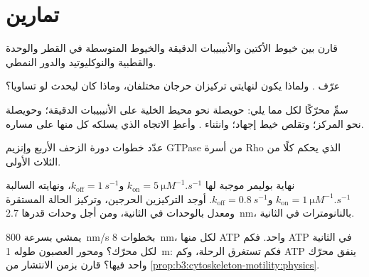 \section{تمارين}

\begin{exercise}[$\star$]\label{exo:b3:cytoskeleton-motility:1}
قارن بين خيوط الأكتين والأنيبيبات الدقيقة والخيوط المتوسطة في
القطر والوحدة والقطبية والنوكليوتيد والدور النمطي.
\end{exercise}

\begin{exercise}[$\star$]\label{exo:b3:cytoskeleton-motility:2}
عرّف . ولماذا يكون لنهايتي 
تركيزان حرجان مختلفان، وماذا كان ليحدث لو
تساويا؟
\end{exercise}

\begin{exercise}[$\star$]\label{exo:b3:cytoskeleton-motility:3}
سمِّ محرّكًا لكل مما يلي: حويصلة نحو محيط الخلية على
الأنيبيبات الدقيقة؛ وحويصلة نحو المركز؛ وتقلص خيط
إجهاد؛ وانثناء . وأعطِ الاتجاه الذي يسلكه كل منها على مساره.
\end{exercise}

\begin{exercise}[$\star$]\label{exo:b3:cytoskeleton-motility:4}
عدّد خطوات دورة الزحف الأربع وإنزيم GTPase من أسرة Rho
الذي يحكم كلًا من الثلاث الأولى.
\end{exercise}

\begin{exercise}[$\star\star$]\label{exo:b3:cytoskeleton-motility:5}
نهاية بوليمر موجبة لها $k_{\text{on}} = \qty{5}{\micro M^{-1}.s^{-1}}$
و$k_{\text{off}} = \qty{1}{s^{-1}}$، ونهايته السالبة $k_{\text{on}} =
\qty{1}{\micro M^{-1}.s^{-1}}$ و$k_{\text{off}} = \qty{0.8}{s^{-1}}$.
أوجد التركيزين الحرجين، وتركيز الحالة المستقرة
ومعدل  بالوحدات في الثانية، ومن أجل
وحدات قدرها \qty{2.7}{nm}، بالنانومترات في الثانية.
\end{exercise}

\begin{exercise}[$\star\star$]\label{exo:b3:cytoskeleton-motility:6}
يمشي  بسرعة \qty{800}{nm/s} بخطوات \qty{8}{nm}، لكل منها ATP واحد.
فكم ATP في الثانية لكل محرّك؟ ومحور العصبون طوله \qty{1}{m}: فكم
تستغرق الرحلة، وكم ATP ينفق محرّك واحد فيها؟ قارن
بزمن الانتشار من \cref{prop:b3:cytoskeleton-motility:physics}.
\end{exercise}

